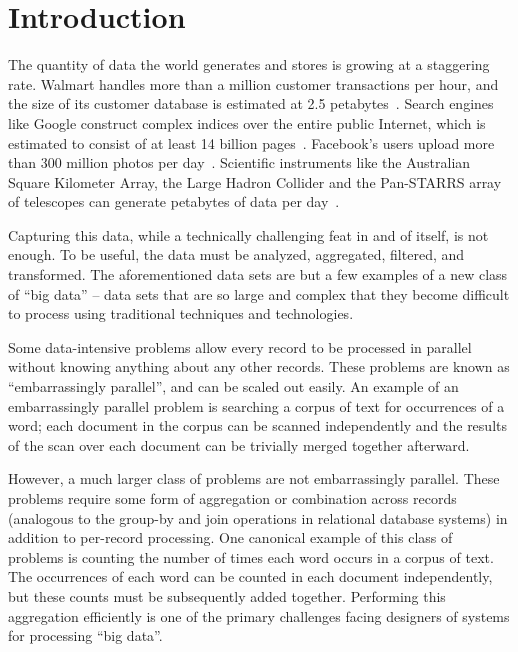 \chapter{Introduction}
\label{chapter:introduction}

The quantity of data the world generates and stores is growing at a staggering
rate. Walmart handles more than a million customer transactions per hour,
and the size of its customer database is estimated at 2.5
petabytes~\cite{economist-data-data-everywhere}. Search engines like Google
construct complex indices over the entire public Internet, which is estimated
to consist of at least 14 billion pages~\cite{worldwidewebsize}. Facebook's
users upload more than 300 million photos per
day~\cite{jay-parikh-slideshow}. Scientific instruments like the Australian
Square Kilometer Array, the Large Hadron Collider and the Pan-STARRS array of
telescopes can generate petabytes of data per day~\cite{fourth-paradigm}.

Capturing this data, while a technically challenging feat in and of itself, is
not enough. To be useful, the data must be analyzed, aggregated, filtered, and
transformed. The aforementioned data sets are but a few examples of a new class
of ``big data'' -- data sets that are so large and complex that they become
difficult to process using traditional techniques and technologies.

Some data-intensive problems allow every record to be processed in parallel
without knowing anything about any other records. These problems are known as
``embarrassingly parallel'', and can be scaled out easily.  An example of an
embarrassingly parallel problem is searching a corpus of text for occurrences
of a word; each document in the corpus can be scanned independently and the
results of the scan over each document can be trivially merged together
afterward.

However, a much larger class of problems are not embarrassingly parallel. These
problems require some form of aggregation or combination across records
(analogous to the group-by and join operations in relational database systems)
in addition to per-record processing. One canonical example of this class of
problems is counting the number of times each word occurs in a corpus of
text. The occurrences of each word can be counted in each document
independently, but these counts must be subsequently added together. Performing
this aggregation efficiently is one of the primary challenges facing designers
of systems for processing ``big data''.

